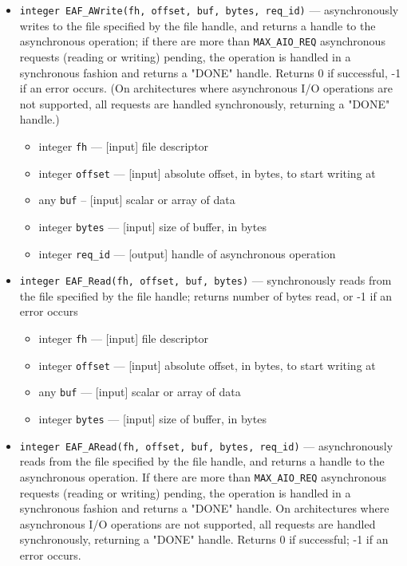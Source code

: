 \begin{itemize}
\item         {\tt integer EAF\_AWrite(fh, offset, buf, bytes, req\_id)} ---
     asynchronously writes to the file specified by the file handle,
     and returns a handle to the asynchronous operation;
     if there are more than {\tt MAX\_AIO\_REQ} asynchronous requests (reading
     or writing) pending, the operation is handled in a synchronous
     fashion and returns a "DONE" handle.
     Returns 
     0 if successful, -1 if an error occurs.
     (On architectures where asynchronous I/O operations are not supported,
     all requests are handled synchronously, returning a "DONE" handle.)

\begin{itemize}
\item     integer {\tt fh} --- [input] file descriptor
\item     integer {\tt offset} --- [input] absolute offset, in bytes, to start writing at
\item     any     {\tt buf} -- [input] scalar or array of data
\item     integer {\tt bytes} --- [input] size of buffer, in bytes
\item     integer {\tt req\_id} --- [output] handle of asynchronous operation
\end{itemize}

\item  {\tt integer EAF\_Read(fh, offset, buf, bytes)} ---
     synchronously reads from the file specified by the file handle;
     returns number of bytes read, or -1 if an error occurs

\begin{itemize}
\item     integer {\tt fh} --- [input] file descriptor
\item     integer {\tt offset} ---  [input] absolute offset, in bytes, to start writing at
\item     any {\tt buf} ---  [input] scalar or array of data
\item     integer {\tt bytes} ---  [input] size of buffer, in bytes
\end{itemize}

\item {\tt integer EAF\_ARead(fh, offset, buf, bytes, req\_id)} ---
     asynchronously reads from the file specified by the file handle,
     and returns a handle to the asynchronous operation.
     If there are more than {\tt MAX\_AIO\_REQ} asynchronous requests (reading
     or writing) pending, the operation is handled in a synchronous
     fashion and returns a "DONE" handle.
     On architectures where asynchronous I/O operations are not supported,
     all requests are handled synchronously, returning a "DONE" handle.
     Returns 
     0 if successful; -1 if an error occurs.


\end{itemize}
